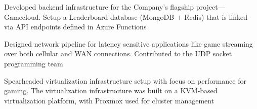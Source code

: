 \begin{cvitemize}
\item Developed backend infrastructure for the Company’s flagship project—Gamecloud. Setup a Leaderboard database (MongoDB + Redis) that is linked via API endpoints defined in Azure Functions
\item Designed network pipeline for latency sensitive applications like game streaming over both cellular and WAN connections. Contributed to the UDP socket programming team
\item Spearheaded virtualization infrastructure setup with focus on performance for gaming. The virtualization infrastructure was built on a KVM-based virtualization platform, with Proxmox used for cluster management

\end{cvitemize}